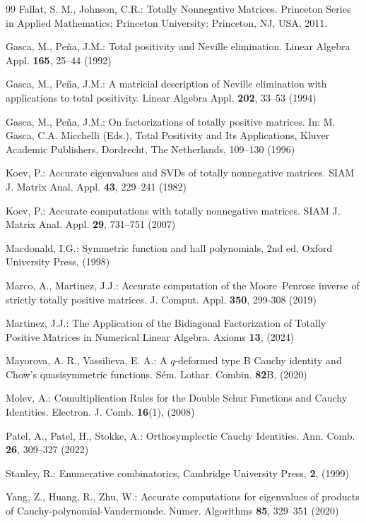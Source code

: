 \documentclass[smallextended]{svjour3}       %
\begin{document}
\begin{thebibliography}{99}
   Fallat, S. M.,  Johnson, C.R.:  Totally Nonnegative Matrices. Princeton Series in Applied Mathematics; Princeton University: Princeton, NJ, USA, 2011. 

  Gasca, M.,  Pe\~na, J.M.: Total positivity and Neville elimination. Linear Algebra Appl. {\bf 165}, 25--44 (1992)

  Gasca, M.,  Pe\~na, J.M.:  A matricial description of Neville elimination with applications to total positivity. Linear Algebra Appl. {\bf 202}, 33--53 (1994)

 Gasca, M.,  Pe\~na, J.M.:  On factorizations of totally positive matrices. In: M. Gasca, C.A. Micchelli (Eds.), Total Positivity and Its Applications, Kluver Academic Publishers, Dordrecht, The Netherlands, 109--130 (1996)

   Koev, P.: Accurate eigenvalues and SVDs of totally nonnegative matrices. SIAM J. Matrix Anal. Appl. {\bf 43}, 229--241 (1982)


  Koev, P.: Accurate computations with totally nonnegative matrices. SIAM J. Matrix Anal. Appl. {\bf 29}, 731--751  (2007)

 Macdonald, I.G.: Symmetric function and hall polynomials, 2nd ed, Oxford University Press, (1998)
 
 Marco, A.,  Martinez, J.J.: Accurate computation of the Moore--Penrose inverse of strictly totally positive matrices. J. Comput. Appl. {\bf 350}, 299-308 (2019)

   Martinez, J.J.: The Application of the Bidiagonal Factorization of Totally Positive Matrices in Numerical Linear Algebra. Axioms {\bf 13}, (2024)

  Mayorova, A. R., Vassilieva,  E. A.: A $q$-deformed type B Cauchy identity and Chow’s quasisymmetric functions. Sém. Lothar. Combin. {\bf 82}B, (2020)  

  Molev, A.: Comultiplication Rules for the Double Schur Functions and Cauchy Identities. Electron. J. Comb. {\bf 16}(1), (2008) 

 Patel, A., Patel,  H., Stokke,  A.:   Orthosymplectic Cauchy Identities. Ann. Comb. {\bf 26},  309–327   (2022)  %

   Stanley, R.: Enumerative combinatorics, Cambridge University Press, {\bf 2}, (1999) 

   Yang, Z., Huang,  R.,  Zhu,  W.: Accurate computations for eigenvalues of products of Cauchy-polynomial-Vandermonde. Numer. Algorithms {\bf 85},  329--351 (2020)
 

\end{thebibliography} 
\end{document}
